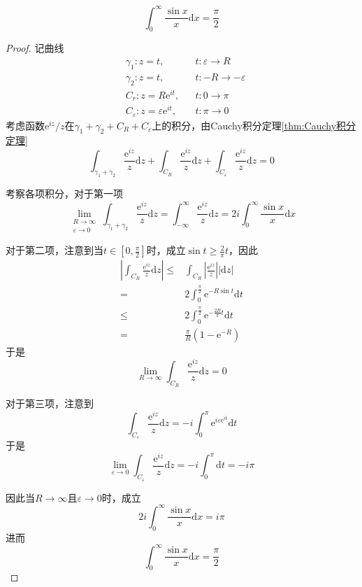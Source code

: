 \documentclass[lang = cn, scheme = chinese, thmcnt = section]{elegantbook}
\begin{document}
\begin{example}
	$$
	\int_{0}^{\infty}{\frac{\sin{x}}{x}}\mathrm{d}x=\frac{\pi}{2}
	$$
\end{example}

\begin{proof}
	记曲线
	\begin{align*}
		&\gamma_1:z=t,&& t:\varepsilon\to R\\
		&\gamma_2:z=t,&& t:-R\to-\varepsilon\\
		&C_r:z=R\mathrm{e}^{it},&& t:0\to\pi\\
		&C_\varepsilon:z=\varepsilon\mathrm{e}^{it},&& t:\pi\to0
	\end{align*}
	考虑函数$\mathrm{e}^{iz}/z$在$\gamma_1+\gamma_2+C_R+C_\varepsilon$​上的积分，由Cauchy积分定理\ref{thm:Cauchy积分定理}
	$$
	\int_{\gamma_1+\gamma_2}{\frac{\mathrm{e}^{iz}}{z}\mathrm{d}z}+\int_{C_R}{\frac{\mathrm{e}^{iz}}{z}\mathrm{d}z}+\int_{C_\varepsilon}{\frac{\mathrm{e}^{iz}}{z}\mathrm{d}z}=0
	$$
	
	考察各项积分，对于第一项
	$$
	\lim_{\substack{R\to\infty\\\varepsilon\to0}}{\int_{\gamma_1+\gamma_2}{\frac{\mathrm{e}^{iz}}{z}}\mathrm{d}z}=\int_{-\infty}^{\infty}{\frac{\mathrm{e}^{iz}}{z}}\mathrm{d}z=2i\int_{0}^{\infty}{\frac{\sin{x}}{x}\mathrm{d}x}
	$$
	
	对于第二项，注意到当$t\in[0,\frac{\pi}{2}]$时，成立$\sin{t}\ge\frac{2}{\pi}t$，因此
	\begin{align*}
		\left|\int_{C_R}{\frac{\mathrm{e}^{iz}}{z}\mathrm{d}z}\right|
		\le&\int_{C_R}{\left|\frac{\mathrm{e}^{iz}}{z}\right||\mathrm{d}z|}\\
		=&2\int_0^{\frac{\pi}{2}}{\mathrm{e}^{-R\sin{t}}\mathrm{d}t}\\
		\le&2\int_0^{\frac{\pi}{2}}{\mathrm{e}^{-\frac{2R}{\pi}t}\mathrm{d}t}\\
		=&\frac{\pi}{R}(1-\mathrm{e}^{-R})
	\end{align*}
	于是
	$$
	\lim_{R\to\infty}\int_{C_R}{\frac{\mathrm{e}^{iz}}{z}\mathrm{d}z}=0
	$$
	
	对于第三项，注意到
	$$
	\int_{C_\varepsilon}{\frac{\mathrm{e}^{iz}}{z}\mathrm{d}z}=-i\int_0^\pi\mathrm{e}^{i\varepsilon\mathrm{e}^{it}}\mathrm{d}t
	$$
	于是
	$$
	\lim_{\varepsilon\to0}\int_{C_\varepsilon}{\frac{\mathrm{e}^{iz}}{z}\mathrm{d}z}=-i\int_0^\pi\mathrm{d}t=-i\pi
	$$
	
	因此当$R\to\infty$且$\varepsilon\to0$​时，成立
	$$
	2i\int_{0}^{\infty}{\frac{\sin{x}}{x}\mathrm{d}x}=i\pi
	$$
	进而
	$$
	\int_{0}^{\infty}{\frac{\sin{x}}{x}\mathrm{d}x}=\frac{\pi}{2}
	$$
\end{proof}
\end{document}
